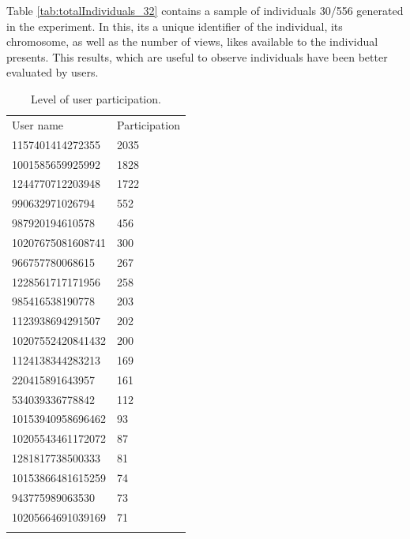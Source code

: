 Table \ref{tab:totalIndividuals_32} contains a sample of individuals 30/556
generated in the experiment. In this, its a unique identifier of the individual,
its chromosome, as well as the number of views, likes available to the individual presents.
This results, which are useful to observe individuals have been better evaluated by users.

\begin{table}
\small
\caption{Level of user participation.}
\label{tab:userParticipation_22}
\centering
\small
\begin{tabular}{p{4cm} p{4cm}}
\hline\noalign{\smallskip}
 User name & Participation   \\
\noalign{\smallskip}\hline\noalign{\smallskip}
\small{1157401414272355} & \small{2035} \\ \hline
\small{1001585659925992} & \small{1828} \\ \hline
\small{1244770712203948} & \small{1722} \\ \hline
\small{990632971026794} & \small{552} \\ \hline
\small{987920194610578} & \small{456} \\ \hline
\small{10207675081608741} & \small{300} \\ \hline
\small{966757780068615} & \small{267} \\ \hline
\small{1228561717171956} & \small{258} \\ \hline
\small{985416538190778} & \small{203} \\ \hline
\small{1123938694291507} & \small{202} \\ \hline
\small{10207552420841432} & \small{200} \\ \hline
\small{1124138344283213} & \small{169} \\ \hline
\small{220415891643957} & \small{161} \\ \hline
\small{534039336778842} & \small{112} \\ \hline
\small{10153940958696462} & \small{93} \\ \hline
\small{10205543461172072} & \small{87} \\ \hline
\small{1281817738500333} & \small{81} \\ \hline
\small{10153866481615259} & \small{74} \\ \hline
\small{943775989063530} & \small{73} \\ \hline
\small{10205664691039169} & \small{71} \\ \hline


\noalign{\smallskip}\hline
\end{tabular}
\end{table}

